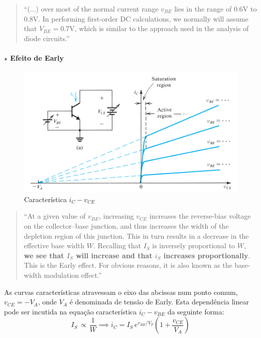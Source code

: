 \vspace{-1.75em}
\begin{quote}\small
    ``(...) over most of the normal current range $v_\textit{BE}$ lies in the range of $0.6$V to $0.8$V. In performing first-order DC calculations, we normally will assume that $V_\textit{BE} = 0.7$V, which is similar to the approach used in the analysis of diode circuits.''\cite{sedra-smith:microelectronic-circuits}
\end{quote}

\vspace{-1.5em}
\paragraph[3.1.2.2 Efeito de Early]{$\pmb{\star}$ Efeito de Early}\mbox{}

\vspace{-1em}
\begin{figure}[H]
    \centering
    \includegraphics[width = 0.75\linewidth]{img/3/BJT/Early.png}
    \caption{Característica $i_C-v_{CE}$}
    \label{fig:Early}
\end{figure}

\vspace{-1.75em}
\begin{quote}\small
    ``At a given value of $v_{BE}$, increasing $v_{CE}$ increases the reverse-bias voltage on the collector–base junction, and thus increases the width of the depletion region of this junction. This in turn results in a decrease in the effective base width $W$. Recalling that $I_S$ is inversely proportional to $W$,\textbf{ we see that $I_S$ will increase and that $i_S$ increases proportionally}. This is the Early effect. For obvious reasons, it is also known as the base-width modulation effect.''\cite{sedra-smith:microelectronic-circuits}
\end{quote}

\noindent As curvas características atravessam o eixo das abcissas num ponto comum, $v_{CE} = -V_A$, onde $V_A$ é denominada de tensão de Early\footnotemark[6]. Esta dependência linear pode ser incutida na equação característica $i_C - v_{BE}$ da seguinte forma:
$$
    I_S\, \propto\, \frac{1}{W} \implies \boxed{i_C = I_S\, e^{v_{BE}/V_T} \left(1 + \frac{v_{CE}}{V_A}\right)}
$$

